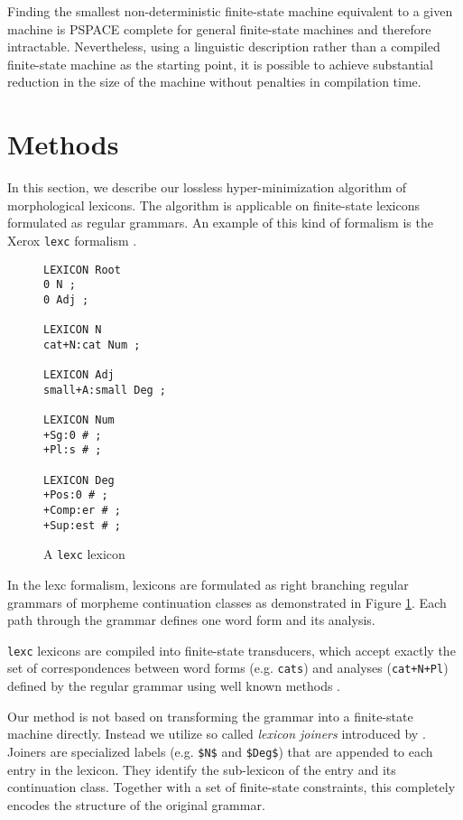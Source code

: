 \documentclass[11pt]{article}
\begin{document}
Finding the smallest non-deterministic finite-state machine equivalent
to a given machine is PSPACE complete \cite{jiang1993} for general
finite-state machines and therefore intractable. Nevertheless, using a
linguistic description rather than a compiled finite-state machine
as the starting point, it is possible to achieve substantial reduction in
the size of the machine without penalties in compilation time.

\section{Methods}\label{sec:methods}

In this section, we describe our lossless hyper-minimization algorithm
of morphological lexicons. The algorithm is applicable on finite-state
lexicons formulated as regular grammars. An example of this kind of
formalism is the Xerox {\tt lexc} formalism \cite{beesley2003finite}.

\begin{figure}
\begin{small}
\begin{verbatim}
LEXICON Root
0 N ;
0 Adj ;

LEXICON N
cat+N:cat Num ;

LEXICON Adj
small+A:small Deg ;

LEXICON Num
+Sg:0 # ;
+Pl:s # ;

LEXICON Deg
+Pos:0 # ;
+Comp:er # ;
+Sup:est # ; 
\end{verbatim}
\end{small}
\caption{A {\tt lexc} lexicon}\label{fig:lexc}
\end{figure}

In the lexc formalism, lexicons are formulated as right branching
regular grammars of morpheme continuation classes as demonstrated in
Figure \ref{fig:lexc}. Each path through the grammar defines one word form
and its analysis. 

{\tt lexc} lexicons are compiled into finite-state transducers, which
accept exactly the set of correspondences between word forms
(e.g. {\tt cats}) and analyses ({\tt cat+N+Pl}) defined by the regular
grammar using well known methods \cite{hopcroft2006}.

Our method is not based on transforming the grammar into a finite-state
machine directly. Instead we utilize so called {\it lexicon joiners}
introduced by \cite{linden2009}. Joiners are specialized labels
(e.g. {\tt \$N\$} and {\tt \$Deg\$}) that are appended to each
entry in the lexicon. They identify the sub-lexicon of the entry and
its continuation class. Together with a set of finite-state
constraints, this completely encodes the structure of the original
grammar.
\end{document}
